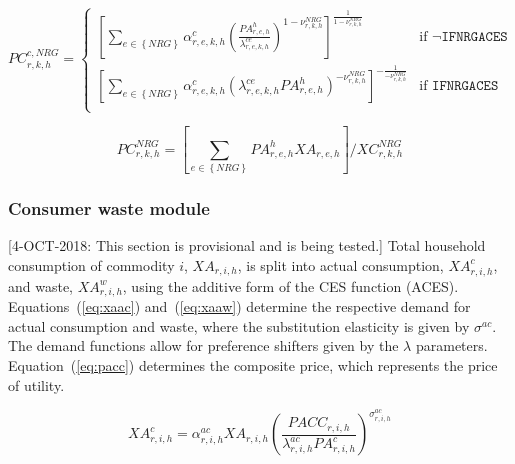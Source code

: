 \documentclass[11pt,letterpaper]{report}
\begin{document}
\begin{equation}
\label{eq:pacnrgc}
\mathit{PC}^{c,\mathit{NRG}}_{r,k,h} =
\begin{cases}
  \left[\displaystyle
        \sum_{e \in \left\{ \mathit{NRG} \right\}} {
           \alpha^{\mathit{c}}_{r,e,k,h}
           \left( \frac {\mathit{PA}^h_{r,e,h}} {\lambda^{\mathit{ce}}_{r,e,k,h}}
           \right)^{1 - \nu^{\mathit{NRG}}_{\mathit{r,k,h}}}
        }
     \right]^{\frac{1} {1 - \nu^{\mathit{NRG}}_{\mathit{r,k,h}}}} &
   \textrm{if } \lnot \texttt{IFNRGACES} \\
   \left[\displaystyle
         \sum_{e \in \left\{ \mathit{NRG} \right\}} {
            \alpha^{\mathit{c}}_{r,e,k,h}
            \left({\lambda^{\mathit{ce}}_{r,e,k,h} \mathit{PA}^h_{r,e,h}}
            \right)^{-\nu^{\mathit{NRG}}_{\mathit{r,k,h}}}
         }
      \right]^{-\frac{1} {- \nu^{\mathit{NRG}}_{\mathit{r,k,h}}}} &
   \textrm{if } \texttt{IFNRGACES} \\
\end{cases}
\end{equation}

\begin{equation}
\label{eq:pacnrg}
\mathit{PC}^{\mathit{NRG}}_{r,k,h} =
\left[\sum_{e \in \left\{ \mathit{NRG} \right\}}
{ \mathit{PA}^h_{r,e,h} \mathit{XA}_{r,e,h} }
\right]
\bigg / \mathit{XC}^{\mathit{NRG}}_{r,k,h}
\end{equation}

\subsubsection{Consumer waste module}

[4-OCT-2018: This section is provisional and is being tested.] Total household consumption of commodity $i$, $\mathit{XA}_{r,i,h}$, is split into actual
consumption, $\mathit{XA}^c_{r,i,h}$, and waste, $\mathit{XA}^w_{r,i,h}$, using the additive form
of the CES function (ACES). Equations~(\ref{eq:xaac}) and~(\ref{eq:xaaw})
determine the respective demand for actual consumption and waste, where the substitution
elasticity is given by $\sigma^{\mathit{ac}}$.
The demand functions allow for preference
shifters given by the $\lambda$ parameters.
Equation~(\ref{eq:pacc}) determines the composite price, which
represents the price of utility.

\begin{equation}
\label{eq:xaac}
\mathit{XA}^{c}_{r,i,h} =
\alpha^{\mathit{ac}}_{r,i,h} \mathit{XA}_{r,i,h}
\left(
\frac{\mathit{PACC}_{r,i,h}}{\lambda^{\mathit{ac}}_{r,i,h} \mathit{PA}^{c}_{r,i,h}}
\right)^{\sigma^{\mathit{ac}}_{r,i,h}}
\end{equation}
\end{document}
